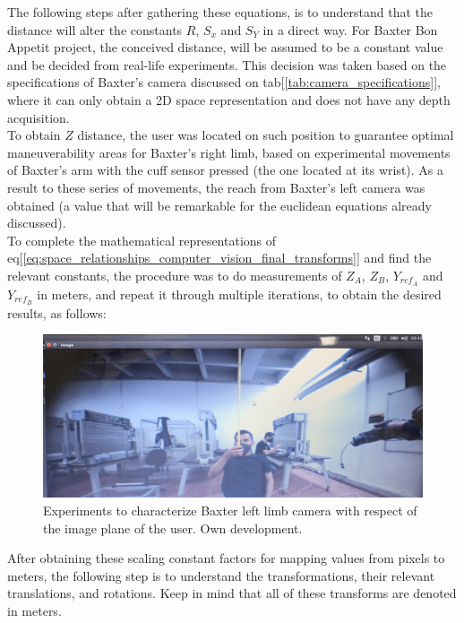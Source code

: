 \documentclass[11pt]{report} %
\begin{document}
The following steps after gathering these equations, is to understand that the  distance will alter the constants $R$, $S_{x}$ and $S_{Y}$ in a direct way. For Baxter Bon Appetit project, the conceived  distance, will be assumed to be a constant value and be decided from real-life experiments. This decision was taken based on the specifications of Baxter's camera discussed on tab[\ref{tab:camera_specifications}], where it can only obtain a 2D space representation and does not have any depth acquisition.\\

To obtain $Z$ distance, the user was located on such position to guarantee optimal maneuverability areas for Baxter's right limb, based on experimental movements of Baxter's arm with the cuff sensor pressed (the one located at its wrist). As a result to these series of movements, the reach from Baxter's left camera was obtained (a value that will be remarkable for the euclidean equations already discussed).\\

To complete the mathematical representations of eq[\ref{eq:space_relationships_computer_vision_final_transforms}] and find the relevant constants, the procedure was to do measurements of $Z_{A}$, $Z_{B}$, $Y_{ref_{A}}$ and $Y_{ref_{B}}$ in meters, and repeat it through multiple iterations, to obtain the desired results, as follows:

\begin{figure}[H]
    \centering
    \includegraphics[width=1.0\linewidth]{assets/imgs/computer_vision/computer_vision_3d_measurements_experiments.png}
    \caption{Experiments to characterize Baxter left limb camera with respect of the image plane of the user. Own development.} 
    \label{fig_real_life_experiments_3d_measurements_frames}
\end{figure}

After obtaining these scaling constant factors for mapping values from pixels to meters, the following step is to understand the transformations, their relevant translations, and rotations. Keep in mind that all of these transforms are denoted in meters.\\
\end{document}
